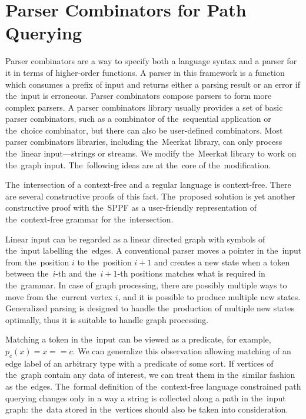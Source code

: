 \section{Parser Combinators for Path Querying}
\label{sec:combinators}

Parser combinators are a way to specify both a language syntax and a parser for it in terms of higher-order functions.
A parser in this framework is a function which consumes a prefix of input and returns either a parsing result or an error if the~input is erroneous.
Parser combinators compose parsers to form more complex parsers.
A parser combinators library usually provides a set of basic parser combinators, such as a combinator of the~sequential application or the~choice combinator, but there can also be user-defined combinators.
Most parser combinators libraries, including the~Meerkat library, can only process the~linear input---strings or streams.
We modify the~Meerkat library to work on the~graph input. The~following ideas are at the~core of the~modification.

The~intersection of a context-free and a regular language is context-free. There are several constructive proofs of this fact.
The~proposed solution is yet another constructive proof with the~SPPF as a user-friendly representation of the~context-free grammar for the~intersection.

Linear input can be regarded as a linear directed graph with symbols of the~input labelling the~edges.
A conventional parser moves a pointer in the~input from the~position $i$ to the~position $i+1$ and creates a new state when a token between the~$i$-th and the~$i+1$-th positions matches what is required in the~grammar.
In case of graph processing, there are possibly multiple ways to move from the~current vertex $i$, and it is possible to produce multiple new states.
Generalized parsing is designed to handle the~production of multiple new states optimally, thus it is suitable to handle graph processing.

Matching a token in the~input can be viewed as a predicate, for example, $p_c (x) = x == c$.
We can generalize this observation allowing matching of an edge label of an arbitrary type with a predicate of some sort.
If vertices of the~graph contain any data of interest, we can treat them in the~similar fashion as the~edges.
The~formal definition of the~context-free language constrained path querying changes only in a way a string is collected along a path in the~input graph: the~data stored in the~vertices should also be taken into consideration.

